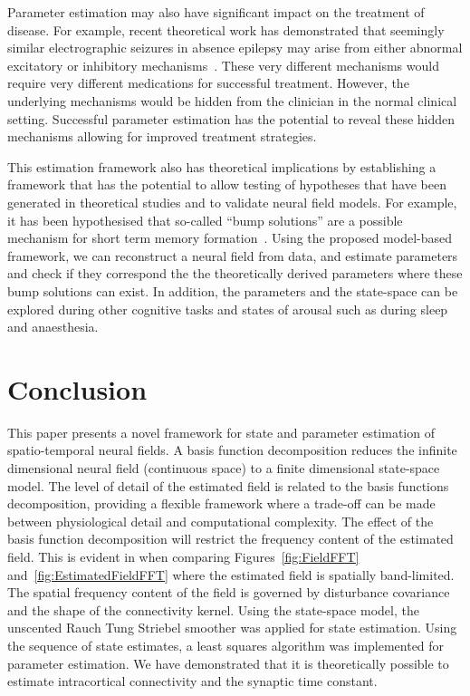 \documentclass[10pt,a4paper]{article}
\begin{document}
Parameter estimation may also have significant impact on the treatment of disease. For example, recent theoretical work has demonstrated that seemingly similar electrographic seizures in absence epilepsy may arise from either abnormal excitatory or inhibitory mechanisms~\cite{Marten2009}. These very different mechanisms would require very different medications for successful treatment. However, the underlying mechanisms would be hidden from the clinician in the normal clinical setting. Successful parameter estimation has the potential to reveal these hidden mechanisms allowing for improved treatment strategies. 

This estimation framework also has theoretical implications by establishing a framework that has the potential to allow testing of hypotheses that have been generated in theoretical studies and to validate neural field models. For example, it has been hypothesised that so-called ``bump solutions'' are a possible mechanism for short term memory formation~\cite{Coombes2005}. Using the proposed model-based framework, we can reconstruct a neural field from data, and estimate parameters and check if they correspond the the theoretically derived parameters where these bump solutions can exist. In addition, the parameters and the state-space can be explored during other cognitive tasks and states of arousal such as during sleep and anaesthesia. 

\section{Conclusion}

This paper presents a novel framework for state and parameter estimation of spatio-temporal neural fields. A basis function decomposition reduces the infinite dimensional neural field (continuous space) to a finite dimensional state-space model. The level of detail of the estimated field is related to the basis functions decomposition, providing a flexible framework where a trade-off can be made between physiological detail and computational complexity. The effect of the basis function decomposition will restrict the frequency content of the estimated field. This is evident in when comparing Figures~\ref{fig:FieldFFT} and~\ref{fig:EstimatedFieldFFT} where the estimated field is spatially band-limited. The spatial frequency content of the field is governed by disturbance covariance and the shape of the connectivity kernel. Using the state-space model, the unscented Rauch Tung Striebel smoother was applied for state estimation. Using the sequence of state estimates, a least squares algorithm was implemented for parameter estimation. We have demonstrated that it is theoretically possible to estimate intracortical connectivity and the synaptic time constant.  
\end{document}
